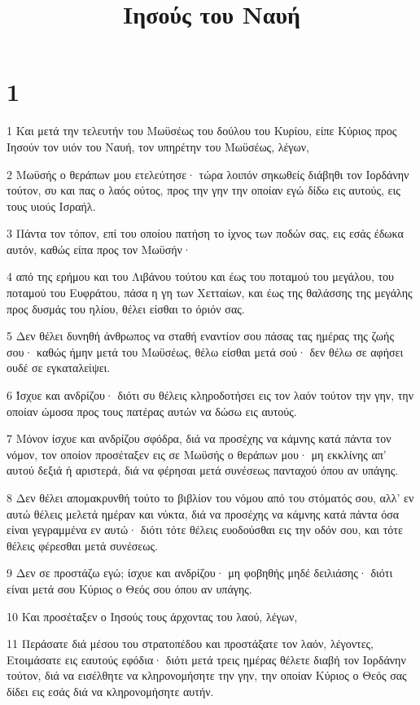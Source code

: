 

\title{Ιησούς του Ναυή}


\chapter{1}

\par 1 Και μετά την τελευτήν του Μωϋσέως του δούλου του Κυρίου, είπε Κύριος προς Ιησούν τον υιόν του Ναυή, τον υπηρέτην του Μωϋσέως, λέγων,
\par 2 Μωϋσής ο θεράπων μου ετελεύτησε· τώρα λοιπόν σηκωθείς διάβηθι τον Ιορδάνην τούτον, συ και πας ο λαός ούτος, προς την γην την οποίαν εγώ δίδω εις αυτούς, εις τους υιούς Ισραήλ.
\par 3 Πάντα τον τόπον, επί του οποίου πατήση το ίχνος των ποδών σας, εις εσάς έδωκα αυτόν, καθώς είπα προς τον Μωϋσήν·
\par 4 από της ερήμου και του Λιβάνου τούτου και έως του ποταμού του μεγάλου, του ποταμού του Ευφράτου, πάσα η γη των Χετταίων, και έως της θαλάσσης της μεγάλης προς δυσμάς του ηλίου, θέλει είσθαι το όριόν σας.
\par 5 Δεν θέλει δυνηθή άνθρωπος να σταθή εναντίον σου πάσας τας ημέρας της ζωής σου· καθώς ήμην μετά του Μωϋσέως, θέλω είσθαι μετά σού· δεν θέλω σε αφήσει ουδέ σε εγκαταλείψει.
\par 6 Ίσχυε και ανδρίζου· διότι συ θέλεις κληροδοτήσει εις τον λαόν τούτον την γην, την οποίαν ώμοσα προς τους πατέρας αυτών να δώσω εις αυτούς.
\par 7 Μόνον ίσχυε και ανδρίζου σφόδρα, διά να προσέχης να κάμνης κατά πάντα τον νόμον, τον οποίον προσέταξεν εις σε Μωϋσής ο θεράπων μου· μη εκκλίνης απ' αυτού δεξιά ή αριστερά, διά να φέρησαι μετά συνέσεως πανταχού όπου αν υπάγης.
\par 8 Δεν θέλει απομακρυνθή τούτο το βιβλίον του νόμου από του στόματός σου, αλλ' εν αυτώ θέλεις μελετά ημέραν και νύκτα, διά να προσέχης να κάμνης κατά πάντα όσα είναι γεγραμμένα εν αυτώ· διότι τότε θέλεις ευοδούσθαι εις την οδόν σου, και τότε θέλεις φέρεσθαι μετά συνέσεως.
\par 9 Δεν σε προστάζω εγώ; ίσχυε και ανδρίζου· μη φοβηθής μηδέ δειλιάσης· διότι είναι μετά σου Κύριος ο Θεός σου όπου αν υπάγης.
\par 10 Και προσέταξεν ο Ιησούς τους άρχοντας του λαού, λέγων,
\par 11 Περάσατε διά μέσου του στρατοπέδου και προστάξατε τον λαόν, λέγοντες, Ετοιμάσατε εις εαυτούς εφόδια· διότι μετά τρεις ημέρας θέλετε διαβή τον Ιορδάνην τούτον, διά να εισέλθητε να κληρονομήσητε την γην, την οποίαν Κύριος ο Θεός σας δίδει εις εσάς διά να κληρονομήσητε αυτήν.
